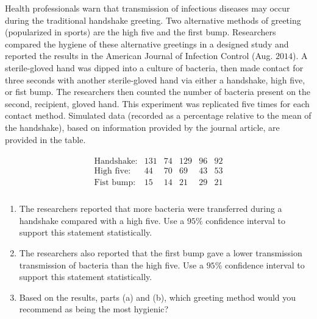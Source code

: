 
\begin{exercise}

Health professionals warn that transmission of infectious diseases may occur during the traditional handshake greeting.
Two alternative methods of greeting (popularized in sports) are the high five and the first bump.
Researchers compared the hygiene of these alternative greetings in a designed study and reported the results in the American Journal of Infection Control (Aug. $2014$).
A sterile-gloved hand was dipped into a culture of bacteria, then made contact for three seconds with another sterile-gloved hand via either a handshake, high five, or fist bump.
The researchers then counted the number of bacteria present on the second, recipient, gloved hand.
This experiment was replicated five times for each contact method.
Simulated data (recorded as a percentage relative to the mean of the handshake), based on information provided by the journal article, are provided in the table.

\begin{align*}
    \begin{array}{llllll}
        \text{Handshake}: & 131 & 74 & 129 & 96 & 92 \\
        \text{High five}: & 44  & 70 & 69  & 43 & 53 \\
        \text{Fist bump}: & 15  & 14 & 21  & 29 & 21 \\
    \end{array}
\end{align*}

\begin{enumerate}[label = (\alph*)]

    \item The researchers reported that more bacteria were transferred during a handshake compared with a high five.
    Use a $95 \%$ confidence interval to support this statement statistically.

    \item The researchers also reported that the first bump gave a lower transmission transmission of bacteria than the high five.
    Use a $95 \%$ confidence interval to support this statement statistically.

    \item Based on the results, parts (a) and (b), which greeting method would you recommend as being the most hygienic?

\end{enumerate}

\end{exercise}


\begin{solution}

\phantom{}

\end{solution}

